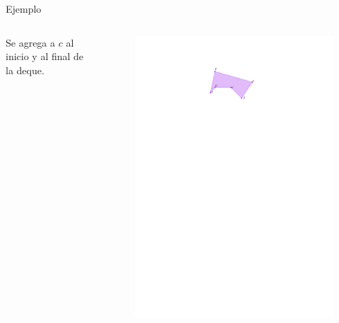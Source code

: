 \documentclass[aspectratio=169,xcolor=dvipsnames, t]{beamer}
\begin{document}
\begin{frame}{Ejemplo}
  \begin{columns}
    \begin{column}{0.5\textwidth}
      Se agrega a $c$ al inicio y al final de la deque.
    \end{column}
    \begin{column}{0.5\textwidth}
      \begin{figure}
        \centering
        \includegraphics[width=\linewidth, height=0.5\textheight, page=5, keepaspectratio]{IPE/Melkman.pdf}
      \end{figure}
    \end{column}
  \end{columns}
\end{frame}
\end{document}
